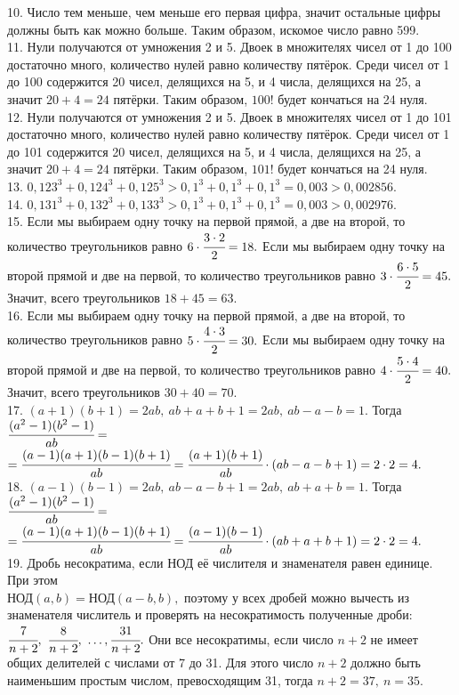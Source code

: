 \documentclass[12pt]{article}
\begin{document}
10. Число тем меньше, чем меньше его первая цифра, значит остальные цифры должны быть как можно больше. Таким образом, искомое число равно 599.\\
11. Нули получаются от умножения 2 и 5. Двоек в множителях чисел от 1 до 100 достаточно много, количество нулей равно количеству пятёрок. Среди чисел от 1 до 100 содержится 20 чисел, делящихся на 5, и 4 числа, делящихся на 25, а значит $20+4=24$ пятёрки. Таким образом, $100!$ будет кончаться на 24 нуля.\\
12. Нули получаются от умножения 2 и 5. Двоек в множителях чисел от 1 до 101 достаточно много, количество нулей равно количеству пятёрок. Среди чисел от 1 до 101 содержится 20 чисел, делящихся на 5, и 4 числа, делящихся на 25, а значит $20+4=24$ пятёрки. Таким образом, $101!$ будет кончаться на 24 нуля.\\
13. $0,123^3+0,124^3+0,125^3>0,1^3+0,1^3+0,1^3=0,003>0,002856.$\\
14. $0,131^3+0,132^3+0,133^3>0,1^3+0,1^3+0,1^3=0,003>0,002976.$\\
15. Если мы выбираем одну точку на первой прямой, а две на второй, то количество треугольников равно $6\cdot\cfrac{3\cdot2}{2}=18.$ Если мы выбираем одну точку на второй прямой и две на первой, то количество треугольников равно $3\cdot\cfrac{6\cdot5}{2}=45.$ Значит, всего треугольников $18+45=63.$\\
16. Если мы выбираем одну точку на первой прямой, а две на второй, то количество треугольников равно $5\cdot\cfrac{4\cdot3}{2}=30.$ Если мы выбираем одну точку на второй прямой и две на первой, то количество треугольников равно $4\cdot\cfrac{5\cdot4}{2}=40.$ Значит, всего треугольников $30+40=70.$\\
17. $(a+1)(b+1)=2ab,\ ab+a+b+1=2ab,\ ab-a-b=1.$ Тогда $\cfrac{(a^2-1)(b^2-1)}{ab}=$\\$=\cfrac{(a-1)(a+1)(b-1)(b+1)}{ab}=\cfrac{(a+1)(b+1)}{ab}\cdot(ab-a-b+1)=2\cdot2=4.$\\
18. $(a-1)(b-1)=2ab,\ ab-a-b+1=2ab,\ ab+a+b=1.$ Тогда $\cfrac{(a^2-1)(b^2-1)}{ab}=$\\$=\cfrac{(a-1)(a+1)(b-1)(b+1)}{ab}=\cfrac{(a-1)(b-1)}{ab}\cdot(ab+a+b+1)=2\cdot2=4.$\\
19. Дробь несократима, если НОД её числителя и знаменателя равен единице. При этом\\ НОД$(a,b)=$НОД$(a-b,b),$ поэтому у всех дробей можно вычесть из знаменателя числитель и проверять на несократимость полученные дроби: $\cfrac{7}{n+2},\ \cfrac{8}{n+2},\ \ldots, \cfrac{31}{n+2}.$ Они все несократимы, если число $n+2$ не имеет общих делителей с числами от 7 до 31. Для этого число $n+2$ должно быть наименьшим простым числом, превосходящим 31, тогда $n+2=37,\ n=35.$\\
\end{document}
